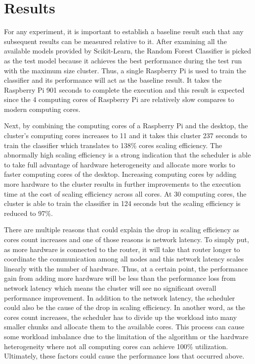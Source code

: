 \documentclass[conference]{IEEEtran}
\begin{document}
    \section{Results}   
        For any experiment, it is important to establish a baseline result such that any subsequent results can be measured relative to it. After examining all the available models provided by Scikit-Learn, the Random Forest Classifier is picked as the test model because it achieves the best performance during the test run with the maximum size cluster. Thus, a single Raspberry Pi is used to train the classifier and its performance will act as the baseline result. It takes the Raspberry Pi 901 seconds to complete the execution and this result is expected since the 4 computing cores of Raspberry Pi are relatively slow compares to modern computing cores. 
            
        Next, by combining the computing cores of a Raspberry Pi and the desktop, the cluster's computing cores increases to 11 and it takes this cluster 237 seconds to train the classifier which translates to 138\% cores scaling efficiency. The abnormally high scaling efficiency is a strong indication that the scheduler is able to take full advantage of hardware heterogeneity and allocate more works to faster computing cores of the desktop. Increasing computing cores by adding more hardware to the cluster results in further improvements to the execution time at the cost of scaling efficiency across all cores. At 30 computing cores, the cluster is able to train the classifier in 124 seconds but the scaling efficiency is reduced to 97\%. 
        
        There are multiple reasons that could explain the drop in scaling efficiency as cores count increases and one of those reasons is network latency. To simply put, as more hardware is connected to the router, it will take that router longer to coordinate the communication among all nodes and this network latency scales linearly with the number of hardware. Thus, at a certain point, the performance gain from adding more hardware will be less than the performance loss from network latency which means the cluster will see no significant overall performance improvement. In addition to the network latency, the scheduler could also be the cause of the drop in scaling efficiency. In another word, as the cores count increases, the scheduler has to divide up the workload into many smaller chunks and allocate them to the available cores. This process can cause some workload imbalance due to the limitation of the algorithm or the hardware heterogeneity where not all computing cores can achieve 100\% utilization. Ultimately, these factors could cause the performance loss that occurred above.              
\end{document}
